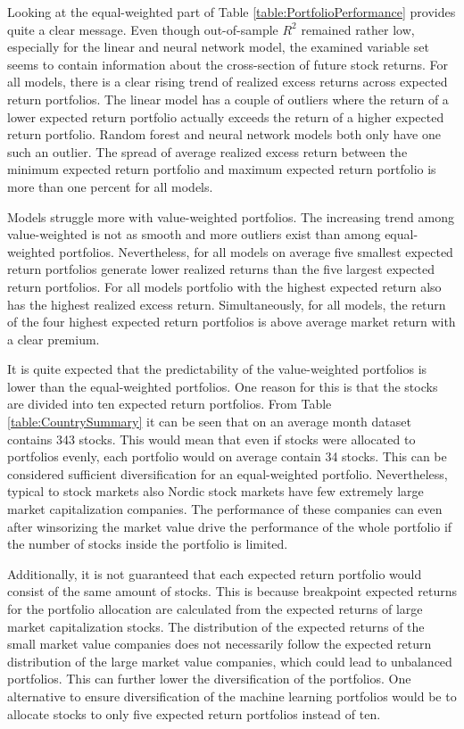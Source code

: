 \documentclass[12pt]{article}
\begin{document}
Looking at the equal-weighted part of Table \ref{table:PortfolioPerformance} provides quite a clear message. Even though out-of-sample $R^2$ remained rather low, especially for the linear and neural network model, the examined variable set seems to contain information about the cross-section of future stock returns. For all models, there is a clear rising trend of realized excess returns across expected return portfolios. The linear model has a couple of outliers where the return of a lower expected return portfolio actually exceeds the return of a higher expected return portfolio. Random forest and neural network models both only have one such an outlier. The spread of average realized excess return between the minimum expected return portfolio and maximum expected return portfolio is more than one percent for all models.  \par

Models struggle more with value-weighted portfolios. The increasing trend among value-weighted is not as smooth and more outliers exist than among equal-weighted portfolios. Nevertheless, for all models on average five smallest expected return portfolios generate lower realized returns than the five largest expected return portfolios. For all models portfolio with the highest expected return also has the highest realized excess return. Simultaneously, for all models, the return of the four highest expected return portfolios is above average market return with a clear premium. \par

It is quite expected that the predictability of the value-weighted portfolios is lower than the equal-weighted portfolios. One reason for this is that the stocks are divided into ten expected return portfolios. From Table \ref{table:CountrySummary} it can be seen that on an average month dataset contains 343 stocks. This would mean that even if stocks were allocated to portfolios evenly, each portfolio would on average contain 34 stocks. This can be considered sufficient diversification for an equal-weighted portfolio. Nevertheless, typical to stock markets also Nordic stock markets have few extremely large market capitalization companies. The performance of these companies can even after winsorizing the market value drive the performance of the whole portfolio if the number of stocks inside the portfolio is limited. \par

Additionally, it is not guaranteed that each expected return portfolio would consist of the same amount of stocks. This is because breakpoint expected returns for the portfolio allocation are calculated from the expected returns of large market capitalization stocks. The distribution of the expected returns of the small market value companies does not necessarily follow the expected return distribution of the large market value companies, which could lead to unbalanced portfolios. This can further lower the diversification of the portfolios. One alternative to ensure diversification of the machine learning portfolios would be to allocate stocks to only five expected return portfolios instead of ten. \par
\end{document}
